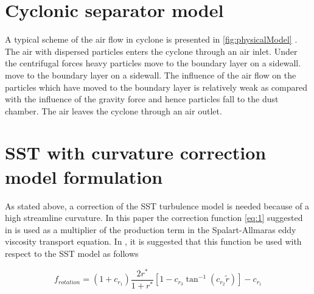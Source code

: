\documentclass[a4paper]{jpconf}
\begin{document}
\section{Cyclonic separator model}
A typical scheme of the air flow in cyclone is presented in \cref{fig:physicalModel} \cite{instructions}. The air with dispersed particles enters the cyclone through an air inlet. Under the centrifugal forces heavy particles move to the boundary layer on a sidewall. move to the boundary layer on a sidewall. The influence of the air flow on the particles which have moved to the boundary layer is relatively weak as compared with the influence of the gravity force and hence particles fall to the dust chamber. The air leaves the cyclone through an air outlet.
\section{SST with curvature correction model formulation}
\label{sec:model}
As stated above, a correction of the SST turbulence model is needed because of a high streamline curvature. In this paper the correction function \eqref{eq:1} suggested in \cite{ShurSpallart} is used as a multiplier of the production term in the Spalart-Allmaras eddy viscosity transport equation. In \cite{Smirnov}, it is suggested that this function be used with respect to the SST model as follows

\begin{equation}
\label{eq:1}
f_{rotation} = (1+c_{r_1}) \frac{2r^*}{1+r^*} [1-c_{r_3}\tan^{-1}(c_{r_2}\tilde{r})] -c_{r_1}
\end{equation}
\end{document}
